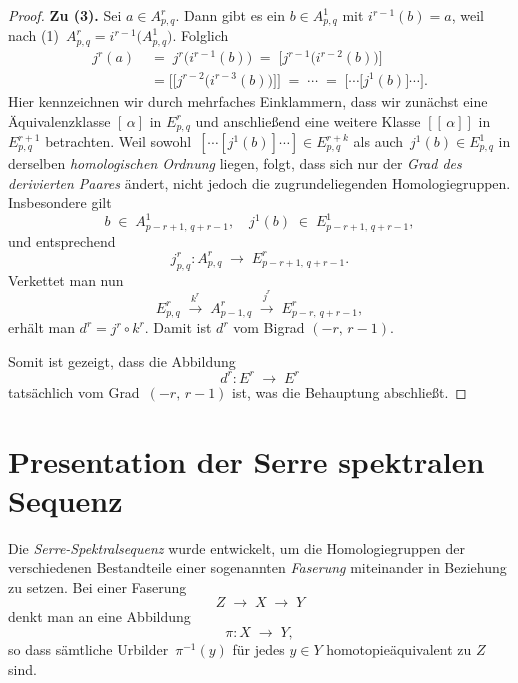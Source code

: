 \documentclass[12pt, hidelinks]{article}
\numberwithin{conj}{section}
\begin{document}
\begin{proof}
    \smallskip
    \noindent
    \textbf{Zu (3).} Sei \(a \in A^r_{p,q}\). Dann gibt es ein \(b \in A^1_{p,q}\) mit \(i^{r-1}(b) = a\), weil nach (1) \(\,A^r_{p,q} = i^{r-1}\bigl(A^1_{p,q}\bigr)\). Folglich
    \begin{align}
        j^r(a)
          & \;=\;                                                     
        j^r\bigl(i^{r-1}(b)\bigr)
        \;=\;
        \bigl[j^{r-1}\bigl(i^{r-2}(b)\bigr)\bigr] \\\nonumber
          & \;= \bigl[\bigl[j^{r-2}\bigl(i^{r-3}(b)\bigr)\bigr]\bigr] 
        \;=\;
        \cdots
        \;=\;
        \bigl[\cdots \bigl[j^1(b)\bigr]\cdots\bigr].
    \end{align}
    Hier kennzeichnen wir durch mehrfaches Einklammern, dass wir zunächst eine Äquivalenzklasse \([\,\alpha]\) in \(E^r_{p,q}\) und anschließend eine weitere Klasse \([[\,\alpha]]\) in \(E^{r+1}_{p,q}\) betrachten. Weil sowohl
    \(\,[\cdots [j^1(b)] \cdots] \in E^{r+k}_{p,q}\) 
    als auch 
    \(\,j^1(b) \in E^1_{p,q}\)
    in derselben \emph{homologischen Ordnung} liegen, folgt, dass sich nur der \emph{Grad des derivierten Paares} ändert, nicht jedoch die zugrundeliegenden Homologiegruppen. Insbesondere gilt
    \[
        b \;\in\; A^1_{p-r+1,\,q+r-1},
        \quad
        j^1(b) \;\in\; E^1_{p-r+1,\,q+r-1},
    \]
    und entsprechend
    \[
        j^r_{p,q} : A^r_{p,q} \;\longrightarrow\; E^r_{p-r+1,\,q+r-1}.
    \]
    Verkettet man nun
    \[
        E^r_{p,q} \;\xrightarrow{k^r}\; A^r_{p-1,q}
        \;\xrightarrow{j^r}\; E^r_{p-r,\,q+r-1},
    \]
    erhält man \(d^r = j^r \circ k^r\). Damit ist \(d^r\) vom Bigrad \((-r,\,r-1)\).
    
    \bigskip
    
    \noindent
    Somit ist gezeigt, dass die Abbildung
    \[
        d^r : E^r \;\longrightarrow\; E^r
    \]
    tatsächlich vom Grad \(\,(-r,\,r-1)\) ist, was die Behauptung abschließt.
\end{proof}

\section{Presentation der Serre spektralen Sequenz}
Die \emph{Serre-Spektralsequenz} wurde entwickelt, um die Homologiegruppen der verschiedenen Bestandteile einer sogenannten \emph{Faserung} miteinander in Beziehung zu setzen. Bei einer Faserung 
\[
    Z \;\longrightarrow\; X \;\longrightarrow\; Y
\]
denkt man an eine Abbildung 
\[
    \pi : X \;\longrightarrow\; Y,
\]
so dass sämtliche Urbilder \(\,\pi^{-1}(y)\) für jedes \(y \in Y\) homotopieäquivalent zu \(Z\) sind. 
\end{document}
